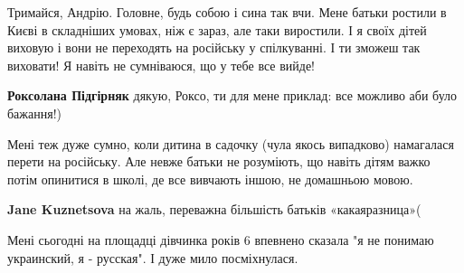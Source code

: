 \begin{itemize}
 

Тримайся, Андрію. Головне, будь собою і сина так вчи. Мене батьки ростили в
Києві в складніших умовах, ніж є зараз, але таки виростили. \Smiley[1.0][yellow] І я своїх дітей
виховую і вони не переходять на російську у спілкуванні. І ти зможеш так
виховати! Я навіть не сумніваюся, що у тебе все вийде!

\begin{itemize}
 
\textbf{Роксолана Підгірняк} дякую, Роксо, ти для мене приклад: все можливо аби було бажання!)
\end{itemize}

 

Мені теж дуже сумно, коли дитина в садочку (чула якось випадково) намагалася
перети на російську. Але невже батьки не розуміють, що навіть дітям важко потім
опинитися в школі, де все вивчають іншою, не домашньою мовою.

\begin{itemize}
 
\textbf{Jane Kuznetsova} на жаль, переважна більшість батьків «какаяразница»(
\end{itemize}

 
Мені сьогодні на площадці дівчинка років 6 впевнено сказала "я не понимаю
украинский, я - русская". І дуже мило посміхнулася.


\end{itemize}
